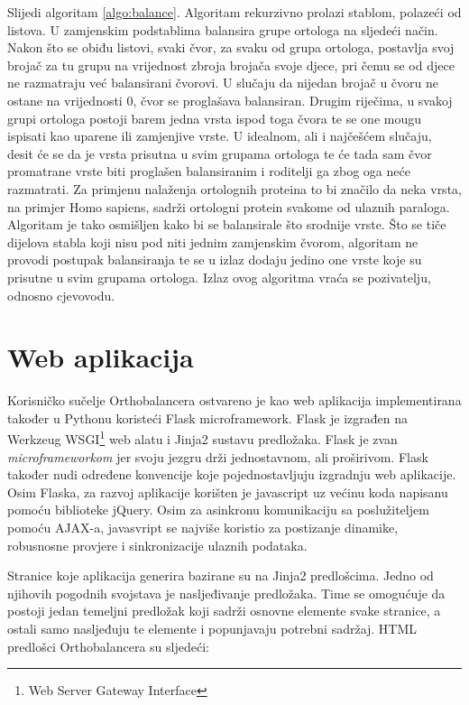 Slijedi algoritam \ref{algo:balance}. Algoritam rekurzivno prolazi stablom,
polazeći od listova. U zamjenskim podstablima balansira grupe ortologa na
sljedeći način. Nakon što se obiđu listovi, svaki čvor, za svaku od grupa
ortologa, postavlja svoj brojač za tu grupu na vrijednost zbroja brojača svoje
djece, pri čemu se od djece ne razmatraju već balansirani čvorovi. U slučaju da
nijedan brojač u čvoru ne ostane na vrijednosti $0$, čvor se proglašava
balansiran. Drugim riječima, u svakoj grupi ortologa postoji barem jedna vrsta
ispod toga čvora te se one mougu ispisati kao uparene ili zamjenjive vrste.  U
idealnom, ali i najčešćem slučaju, desit će se da je vrsta prisutna u svim
grupama ortologa te će tada sam čvor promatrane vrste biti proglašen
balansiranim i roditelji ga zbog oga neće razmatrati. Za primjenu nalaženja
ortolognih proteina to bi značilo da neka vrsta, na primjer Homo sapiens, sadrži
ortologni protein svakome od ulaznih paraloga. Algoritam je tako osmišljen kako
bi se balansirale što srodnije vrste.  Što se tiče dijelova stabla koji nisu pod
niti jednim zamjenskim čvorom, algoritam ne provodi postupak balansiranja te se
u izlaz dodaju jedino one vrste koje su prisutne u svim grupama ortologa. Izlaz
ovog algoritma vraća se pozivatelju, odnosno cjevovodu.


\section{Web aplikacija}
\label{sec:server}

Korisničko sučelje Orthobalancera ostvareno je kao web aplikacija implementirana
također u Pythonu koristeći Flask microframework. Flask je izgrađen na Werkzeug
WSGI\footnote{Web Server Gateway Interface\cite{pep333}} web alatu i Jinja2
sustavu predložaka. Flask je zvan \emph{microframeworkom} jer svoju jezgru drži
jednostavnom, ali proširivom. Flask također nudi određene konvencije koje
pojednostavljuju izgradnju web aplikacije. Osim Flaska, za razvoj aplikacije
korišten je javascript uz većinu koda napisanu pomoću biblioteke jQuery. Osim za
asinkronu komunikaciju sa poslužiteljem pomoću AJAX-a, javasvript se najviše
koristio za postizanje dinamike, robusnosne provjere i sinkronizacije ulaznih
podataka.

Stranice koje aplikacija generira bazirane su na Jinja2 predlošcima. Jedno od
njihovih pogodnih svojstava je nasljeđivanje predložaka. Time se omogućuje da
postoji jedan temeljni predložak koji sadrži osnovne elemente svake stranice, a
ostali samo nasljeđuju te elemente i popunjavaju potrebni sadržaj. HTML
predlošci Orthobalancera su sljedeći:


